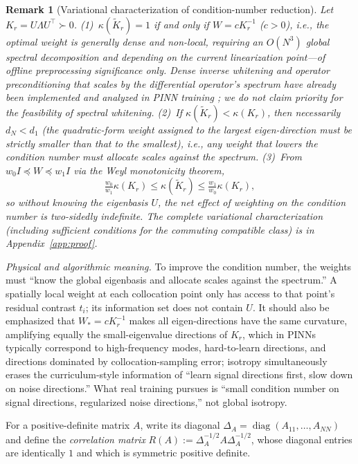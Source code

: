 \documentclass[11pt]{article}
\newcommand{\W}{W}
\DeclareMathOperator{\diag}{diag}
\newtheorem*{remark}{Remark}
\numberwithin{equation}{section}
\begin{document}
\begin{remark}[Variational characterization of condition-number reduction]\label{rem:variational}
Let $K_r=U\Lambda U^\top\succ0$. (1)~$\kappa(\widetilde K_r)=1$ if and only if $\W=cK_r^{-1}$ ($c>0$), i.e., the optimal weight is generally dense and \emph{non-local}, requiring an $O(N^3)$ global spectral decomposition and depending on the current linearization point---of offline preprocessing significance only. Dense inverse whitening and operator preconditioning that scales by the differential operator's spectrum \emph{have already been implemented and analyzed} in PINN training \cite{deRyckOp2024,PCPINN2024}; we do not claim priority for the feasibility of spectral whitening. (2)~If $\kappa(\widetilde K_r)<\kappa(K_r)$, then necessarily $d_N<d_1$ (the quadratic-form weight assigned to the largest eigen-direction must be strictly smaller than that to the smallest), i.e., any weight that lowers the condition number must allocate scales against the spectrum. (3)~From $w_0I\preceq\W\preceq w_1I$ via the Weyl monotonicity theorem,
\begin{equation}\label{eq:kappabound}
\tfrac{w_0}{w_1}\kappa(K_r)\le\kappa(\widetilde K_r)\le\tfrac{w_1}{w_0}\kappa(K_r),
\end{equation}
so without knowing the eigenbasis $U$, the net effect of weighting on the condition number is two-sidedly indefinite. The complete variational characterization (including sufficient conditions for the commuting compatible class) is in Appendix~\ref{app:proof}.
\end{remark}

\noindent\emph{Physical and algorithmic meaning.} To improve the condition number, the weights must ``know the global eigenbasis and allocate scales against the spectrum.'' A spatially local weight at each collocation point only has access to that point's residual contrast $t_i$; its information set does not contain $U$. It should also be emphasized that $\W_*=cK_r^{-1}$ makes all eigen-directions have the same curvature, amplifying equally the small-eigenvalue directions of $K_r$, which in PINNs typically correspond to high-frequency modes, hard-to-learn directions, and directions dominated by collocation-sampling error; isotropy simultaneously erases the curriculum-style information of ``learn signal directions first, slow down on noise directions.'' What real training pursues is ``small condition number on signal directions, regularized noise directions,'' not global isotropy.

For a positive-definite matrix $A$, write its diagonal $\Delta_A=\diag(A_{11},\dots,A_{NN})$ and define the \emph{correlation matrix} $R(A):=\Delta_A^{-1/2}A\Delta_A^{-1/2}$, whose diagonal entries are identically $1$ and which is symmetric positive definite.
\end{document}
